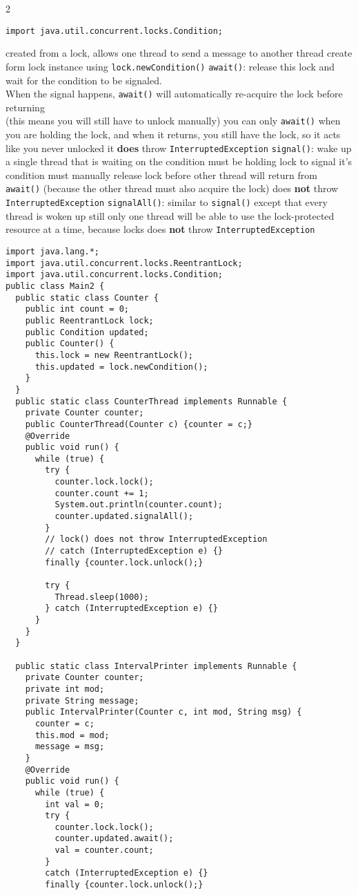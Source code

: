 \documentclass{article}
\def \columncount {2}
\newcommand{\java}{\texttt}
\begin{document}
\begin{multicols}{\columncount}
\begin{outline}[longenum]
\0
\begin{verbatim}
import java.util.concurrent.locks.Condition;
\end{verbatim}
  \1 created from a lock, allows one thread to send a message to another thread
    \2 create form lock instance using \java{lock.newCondition()}
  \1 \java{await()}: release this lock and wait for the condition to be signaled.
    \\ When the signal happens, \java{await()} will automatically re-acquire the lock before returning
    \\ (this means you will still have to unlock manually)
    \2 you can only \java{await()} when you are holding the lock, and when it returns, you still have the lock, so it acts like you never unlocked it
    \2 \textbf{does} throw \java{InterruptedException}
  \1 \java{signal()}: wake up a single thread that is waiting on the condition
    \2 must be holding lock to signal it's condition
    \2 must manually release lock before other thread will return from \java{await()} (because the other thread must also acquire the lock)
    \2 does \textbf{not} throw \java{InterruptedException}
  \1 \java{signalAll()}: similar to \java{signal()} except that every thread is woken up
    \2 still only one thread will be able to use the lock-protected resource at a time, because locks
    \2 does \textbf{not} throw \java{InterruptedException}
\0
\begin{verbatim}
import java.lang.*;
import java.util.concurrent.locks.ReentrantLock;
import java.util.concurrent.locks.Condition;
public class Main2 {
  public static class Counter {
    public int count = 0;
    public ReentrantLock lock;
    public Condition updated;
    public Counter() {
      this.lock = new ReentrantLock();
      this.updated = lock.newCondition();
    }
  }
  public static class CounterThread implements Runnable {
    private Counter counter;
    public CounterThread(Counter c) {counter = c;}
    @Override
    public void run() {
      while (true) {
        try {
          counter.lock.lock();
          counter.count += 1;
          System.out.println(counter.count);
          counter.updated.signalAll();
        } 
        // lock() does not throw InterruptedException
        // catch (InterruptedException e) {}
        finally {counter.lock.unlock();}
        
        try {
          Thread.sleep(1000);
        } catch (InterruptedException e) {}
      }
    }
  }

  public static class IntervalPrinter implements Runnable {
    private Counter counter;
    private int mod;
    private String message;
    public IntervalPrinter(Counter c, int mod, String msg) {
      counter = c;
      this.mod = mod;
      message = msg;
    }
    @Override
    public void run() {
      while (true) {
        int val = 0;
        try {
          counter.lock.lock();
          counter.updated.await();
          val = counter.count;
        } 
        catch (InterruptedException e) {}
        finally {counter.lock.unlock();}


\end{verbatim}
\end{outline}
\end{multicols}
\end{document}
